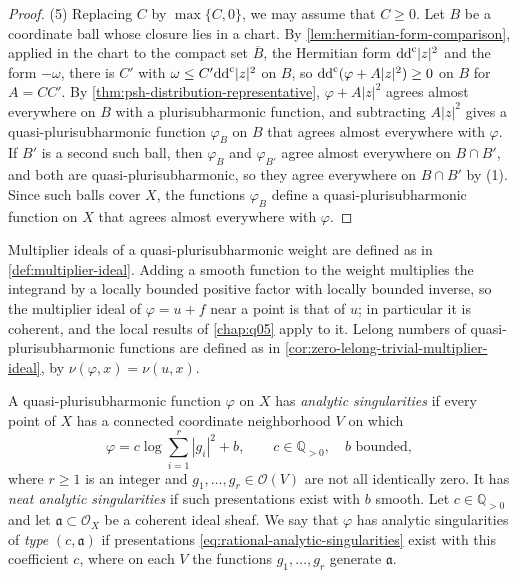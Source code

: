 \begin{proof}
(5) Replacing $C$ by $\max\{C,0\}$, we may assume that $C\geq0$. Let $B$ be a coordinate ball whose closure lies in a chart. By \cref{lem:hermitian-form-comparison}, applied in the chart to the compact set $\overline B$, the Hermitian form $\mathrm{dd}^{\mathrm{c}}|z|^2$ and the form $-\omega$, there is $C'$ with $\omega\leq C'\mathrm{dd}^{\mathrm{c}}|z|^2$ on $B$, so $\mathrm{dd}^{\mathrm{c}}(\varphi+A|z|^2)\geq0$ on $B$ for $A=CC'$. By \cref{thm:psh-distribution-representative}, $\varphi+A|z|^2$ agrees almost everywhere on $B$ with a plurisubharmonic function, and subtracting $A|z|^2$ gives a quasi-plurisubharmonic function $\varphi_B$ on $B$ that agrees almost everywhere with $\varphi$. If $B'$ is a second such ball, then $\varphi_B$ and $\varphi_{B'}$ agree almost everywhere on $B\cap B'$, and both are quasi-plurisubharmonic, so they agree everywhere on $B\cap B'$ by (1). Since such balls cover $X$, the functions $\varphi_B$ define a quasi-plurisubharmonic function on $X$ that agrees almost everywhere with $\varphi$.
\end{proof}

Multiplier ideals of a quasi-plurisubharmonic weight are defined as in \cref{def:multiplier-ideal}. Adding a smooth function to the weight multiplies the integrand by a locally bounded positive factor with locally bounded inverse, so the multiplier ideal of $\varphi=u+f$ near a point is that of $u$; in particular it is coherent, and the local results of \cref{chap:q05} apply to it. Lelong numbers of quasi-plurisubharmonic functions are defined as in \cref{cor:zero-lelong-trivial-multiplier-ideal}, by $\nu(\varphi,x)=\nu(u,x)$.

\begin{definition}\label{def:rational-analytic-singularities}
A quasi-plurisubharmonic function $\varphi$ on $X$ has \emph{analytic singularities} if every point of $X$ has a connected coordinate neighborhood $V$ on which
\begin{equation}\label{eq:rational-analytic-singularities}
 \varphi=c\log\sum_{i=1}^r|g_i|^2+b,
 \qquad c\in\mathbb Q_{>0},\quad b\text{ bounded},
\end{equation}
where $r\geq1$ is an integer and $g_1,\ldots,g_r\in\mathcal O(V)$ are not all identically zero. It has \emph{neat analytic singularities} if such presentations exist with $b$ smooth. Let $c\in\mathbb Q_{>0}$ and let $\mathfrak a\subset\mathcal O_X$ be a coherent ideal sheaf. We say that $\varphi$ has analytic singularities of \emph{type} $(c,\mathfrak a)$ if presentations \eqref{eq:rational-analytic-singularities} exist with this coefficient $c$, where on each $V$ the functions $g_1,\ldots,g_r$ generate $\mathfrak a$.
\end{definition}

